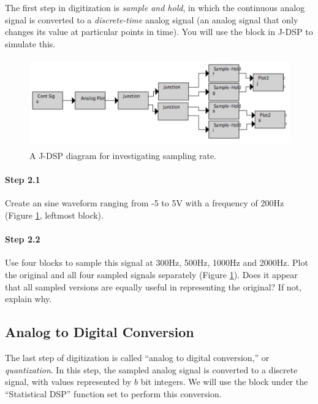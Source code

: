 	The first step in digitization is \emph{sample and hold}, in which the
	continuous analog signal is converted to a \textit{discrete-time} analog signal
	(an analog signal that only changes its value at particular points in
	time). You will use the  block in J-DSP to simulate this.
	
	\begin{figure}[h]
	  \begin{center}
	    \includegraphics[height=1.5in]{lab3/block_diagram_step2}
	  \end{center}
	\caption{ A J-DSP diagram for investigating sampling rate. \label{fg:step2}}
	\end{figure}

\paragraph{Step 2.1} Create an  sine waveform ranging
	from -5 to 5V with a frequency of 200Hz (Figure \ref{fg:step2}, leftmost block).

\paragraph{Step 2.2} Use four  blocks to sample
	this signal at 300Hz, 500Hz, 1000Hz and 2000Hz. Plot the original and all four sampled signals 
	separately (Figure \ref{fg:step2}). Does it appear that all sampled versions are equally useful in 
	representing the original? If not, explain why.
	

\subsection{Analog to Digital Conversion}

	The last step of digitization is called ``analog to digital conversion,'' or \emph{quantization}. In 
	this step, the sampled analog signal is converted to a discrete signal, with values represented 
	by $b$ bit integers. We will use the  block under the ``Statistical DSP'' function 
	set to perform this conversion.
	
